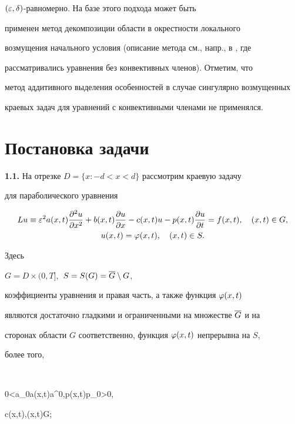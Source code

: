 $(\varepsilon,\delta)$-равномерно. На базе этого подхода может быть 


применен метод декомпозиции области в окрестности локального


возмущения начального условия (описание метода см., напр., в \cite{Sh2}, где


рассматривались уравнения без конвективных членов). Отметим, что 


метод аддитивного выделения особенностей в случае сингулярно возмущенных


краевых задач для уравнений с конвективными членами не применялся.








\section{Постановка задачи}





{\bf 1.1.} На отрезке $D=\{x:-d<x<d\}$ рассмотрим краевую задачу


для параболического уравнения 


\begin{gather} \label{1.1}


Lu \equiv \eps^2a(x,t)\frac{\pa^2 u}{\pa x^2} +


b(x,t)\frac{\pa u}{\pa x}-c(x,t)u-p(x,t)\frac{\pa u}{\pa t}=


f(x,t),\quad (x,t)\in{G}, \\ 


u(x,t)=\vf(x,t),\quad (x,t)\in S.\notag


\end{gather}


Здесь 


$G=D\times(0,T],$ $S=S(G)=\overline{G} \setminus G$,


коэффициенты уравнения и правая часть, а также функция $\varphi(x,t)$ 


являются достаточно гладкими и ограниченными на множестве $\overline{G}$ и на


сторонах области $G$ соответственно, функция $\varphi(x,t)$ непрерывна на $S$,


более того, 


$$


0<a_0\le a(x,t)\le a^0,\quad p(x,t)\ge p_0>0,\quad 


c(x,t),\quad (x,t)\in G;


